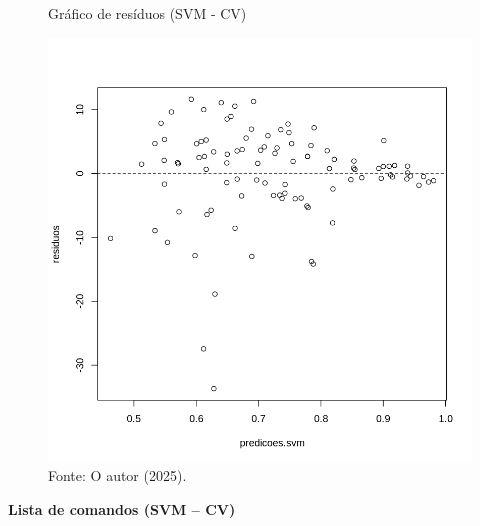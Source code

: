 \begin{figure}[H]
\centering
\caption{Gráfico de resíduos (SVM - CV)}
\includegraphics[width=.8\linewidth]{apendices/fig/8_IAA008_15.png}
\caption*{Fonte: O autor (2025).}
\end{figure}

\begin{center}
    \textbf{Lista de comandos (SVM – CV)}
\end{center}


